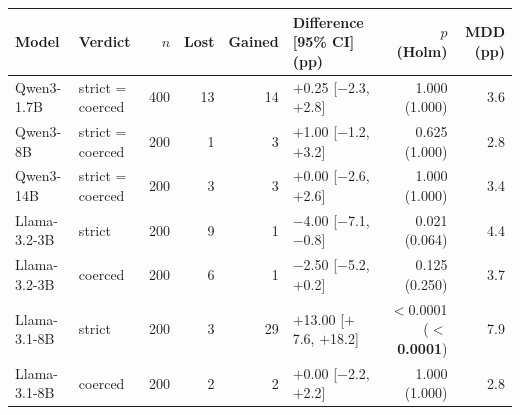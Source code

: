 \begin{tabular}{@{}llrrrlrr@{}}
\toprule
Model & Verdict & $n$ & Lost & Gained & Difference [95\% CI] (pp) & $p$ (Holm) & MDD (pp) \\
\midrule
Qwen3-1.7B & strict = coerced & 400 & 13 & 14 & $+$0.25 [$-$2.3, $+$2.8] & 1.000 (1.000) & 3.6 \\
Qwen3-8B & strict = coerced & 200 & 1 & 3 & $+$1.00 [$-$1.2, $+$3.2] & 0.625 (1.000) & 2.8 \\
Qwen3-14B & strict = coerced & 200 & 3 & 3 & $+$0.00 [$-$2.6, $+$2.6] & 1.000 (1.000) & 3.4 \\
Llama-3.2-3B & strict & 200 & 9 & 1 & $-$4.00 [$-$7.1, $-$0.8] & 0.021 (0.064) & 4.4 \\
Llama-3.2-3B & coerced & 200 & 6 & 1 & $-$2.50 [$-$5.2, $+$0.2] & 0.125 (0.250) & 3.7 \\
Llama-3.1-8B & strict & 200 & 3 & 29 & $+$13.00 [$+$7.6, $+$18.2] & $<$0.0001 (\textbf{$<$0.0001}) & 7.9 \\
Llama-3.1-8B & coerced & 200 & 2 & 2 & $+$0.00 [$-$2.2, $+$2.2] & 1.000 (1.000) & 2.8 \\
\bottomrule
\end{tabular}
